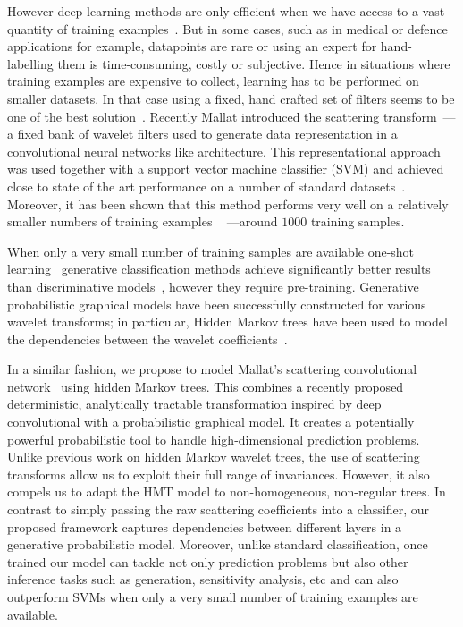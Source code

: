 \documentclass{article}
\begin{document}
  However deep learning methods are only efficient when we have access to a vast quantity of training examples~\cite{glorot2010understanding}. But in some cases, such as in medical or defence applications for example, datapoints are rare or using an expert for hand-labelling them is time-consuming, costly or subjective. Hence in situations where training examples are expensive to collect, learning has to be performed on smaller
  datasets. In that case using a fixed, hand crafted set of filters seems to be one of the best solution~\cite{hsiang2001embedded}. Recently Mallat introduced the scattering transform~\cite{mallat2012gis}--- a fixed bank of wavelet filters used to generate data representation in a convolutional neural networks like architecture. This representational approach was used together with a support vector machine classifier (SVM) and achieved close to state of the art performance on a number of standard datasets~\cite{bruna2010classification}. Moreover, it has been shown that this method performs very well on a relatively smaller numbers of training examples ~\cite{sifre2013rotation} ---\ie around $1000$ training samples.

  When only a very small number of training samples are available one-shot learning~\cite{fei2006one} generative classification methods achieve significantly better results than discriminative models~\cite{jordan2002discriminative}, however they require pre-training. Generative probabilistic graphical models have been successfully constructed for various wavelet transforms; in particular, Hidden Markov trees have been used to model the dependencies between the wavelet coefficients~\cite{crouse1998wavelet, kingsbury2001complex, durand2004computational}.
  
  In a similar fashion, we propose to model Mallat's scattering convolutional network~\cite{bruna2010classification} using hidden Markov trees. This combines a recently proposed deterministic, analytically tractable transformation inspired by deep convolutional with a probabilistic graphical model. It creates a potentially powerful probabilistic tool to handle high-dimensional prediction problems. Unlike previous work on hidden Markov wavelet trees, the use of scattering transforms allow us to exploit their full range of invariances. However, it also compels us to adapt the HMT model to non-homogeneous, non-regular trees. In contrast to simply passing the raw scattering coefficients into a classifier, our proposed framework captures dependencies between different layers in a generative probabilistic model. Moreover, unlike standard classification, once
  trained our model can tackle not only prediction problems but also other inference tasks such as generation, sensitivity analysis, etc and can also outperform SVMs when only a very small number of training examples are available.
\end{document}
